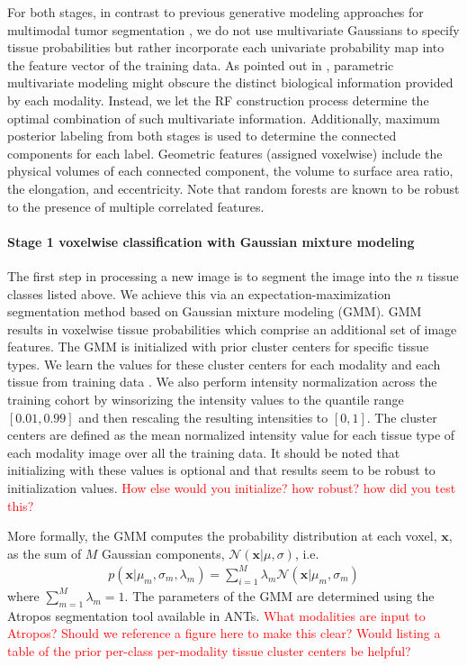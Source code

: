 \documentclass[preprint,authoryear,review,12pt]{elsarticle}
\begin{document}
For both stages, in contrast to previous generative
modeling approaches for multimodal tumor segmentation 
\citep[e.g.,][]{prastawa2003}, we do not use multivariate 
Gaussians to specify tissue probabilities but rather incorporate each
univariate probability map into the feature vector of the training
data.  As pointed out in \cite{menze2010}, parametric multivariate modeling
might obscure the distinct biological information provided by each 
modality.  Instead, we let the RF construction 
process determine the optimal combination of such multivariate
information.  Additionally, maximum posterior labeling from both stages
is used to determine the connected components for each label.  
Geometric features (assigned voxelwise) include the physical volumes 
of each connected component, the volume to surface area ratio, 
the elongation, and eccentricity.  Note that random forests are
known to be robust to the presence of multiple correlated features.

\paragraph{Stage 1 voxelwise classification with Gaussian mixture
  modeling} 
The first step in processing a new image is to segment the image into
the $n$ tissue classes listed above.   We achieve this via an expectation-maximization
segmentation method based on
Gaussian mixture modeling (GMM).  GMM results in voxelwise
tissue probabilities which comprise an additional set of image
features.  The GMM is initialized with prior cluster centers for
specific tissue types.  We learn the values for these cluster centers
for each modality and each tissue from training data
\citep{reynolds2009}.  We also perform intensity normalization
across the training cohort by winsorizing the intensity values to the quantile
range $[0.01, 0.99]$ and then rescaling the resulting intensities to 
$[0,1]$.  The cluster centers are defined as the mean
normalized intensity value for each tissue type of each modality 
image over all the training data.  It should be noted that 
initializing with these values is optional and that results
seem to be robust to initialization values.  \textcolor{red}{How else
  would you initialize? how robust?  how did you test this?}

More formally, the GMM computes the 
probability distribution at each voxel, $\mathbf{x}$, as the
sum of $M$ Gaussian components, $\mathcal{N}(\mathbf{x}|\mu,\sigma)$, i.e.
\begin{align}
p\left(\mathbf{x}|\mu_m,\sigma_m,\lambda_m\right) = \sum_{i=1}^M \lambda_m \mathcal{N}(\mathbf{x}|\mu_m,\sigma_m)
\end{align}
where $\sum_{m=1}^M \lambda_m = 1$.  The parameters of the GMM 
are determined using the 
Atropos segmentation tool \citep{avants2011} available in ANTs.
\textcolor{red}{What modalities are input to Atropos?  Should we
  reference a figure here to make this clear?  Would listing a table of the
  prior per-class per-modality tissue cluster centers be helpful?}
\end{document}
